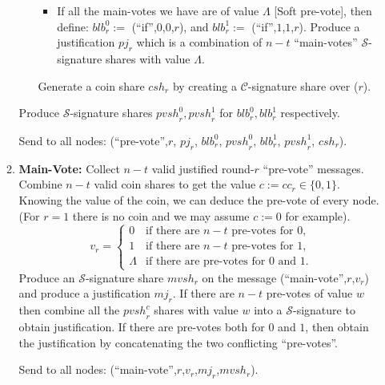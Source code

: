 \begin{algorithm}
\begin{enumerate}
\begin{enumerate}
\begin{itemize}
\begin{itemize}
                \item If all the main-votes we have are of value $\Lambda$ [Soft
                  pre-vote], then define: ${blb}_r^0 :=$
                  (``if'',$0$,$0$,$r$), and ${blb}_r^1 :=$ (``if'',$1$,$1$,$r$).
                  Produce a justification ${pj}_r$ which is a combination of
                  $n-t$ ``main-votes'' $\mathcal{S}$-signature shares with value
                  $\Lambda$.
              \end{itemize}
              Generate a coin share ${csh}_r$ by creating a
              $\mathcal{C}$-signature share over ($r$).
          \end{itemize}

          Produce $\mathcal{S}$-signature shares ${pvsh}_r^0,{pvsh}_r^1$ for
          ${blb}_r^0,{blb}_r^1$ respectively.

          Send to all nodes:
          (``pre-vote'',$r$, ${pj}_r$, $blb_r^0$, ${pvsh}_r^0$,
          ${blb}_r^1$, ${pvsh}_r^1$, ${csh}_r$).

        \item \textbf{Main-Vote:}
          Collect $n-t$ valid justified round-$r$ ``pre-vote'' messages. Combine
          $n-t$ valid coin shares to get the value $c := {cc}_r \in \{0,1\}$.
          Knowing the value of the coin, we can deduce the pre-vote of every
          node. (For $r=1$ there is no coin and we may assume $c := 0$ for
          example).
          \begin{equation*}
            v_r =
            \begin{cases}
              0 & \text{if there are } n-t \text{ pre-votes for } 0, \\
              1 & \text{if there are } n-t \text{ pre-votes for } 1, \\
              \Lambda & \text{if there are pre-votes for } 0 \text{ and } 1.
            \end{cases}
          \end{equation*}
          Produce an $\mathcal{S}$-signature share ${mvsh}_r$ on the message
          (``main-vote'',$r$,$v_r$) and produce a justification ${mj}_r$. If
          there are $n-t$ pre-votes of value $w$ then combine all the
          ${pvsh}_r^c$ shares with value $w$ into a $\mathcal{S}$-signature to
          obtain justification. If there are pre-votes both for $0$ and $1$,
          then obtain the justification by concatenating the two conflicting
          ``pre-votes''.

          Send to all nodes: (``main-vote'',$r$,$v_r$,${mj}_r$,${mvsh}_r$).


\end{enumerate}
\end{enumerate}
\end{algorithm}

